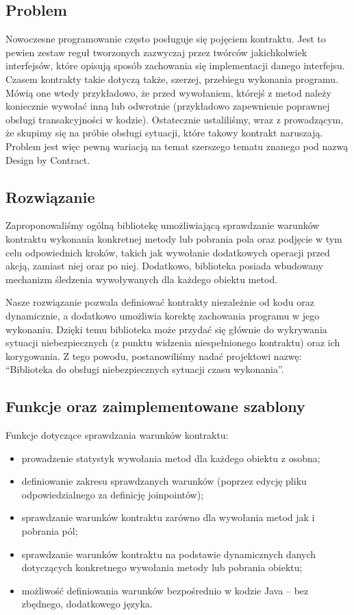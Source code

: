 \documentclass[12pt,a4paper,titlepage]{article}
\begin{document}
 \subsection{Problem}
  Nowoczesne programowanie często posługuje się pojęciem kontraktu. Jest to pewien zestaw reguł tworzonych zazwyczaj przez twórców jakichkolwiek interfejsów, które opisują sposób zachowania się implementacji danego interfejsu. Czasem kontrakty takie dotyczą także, szerzej, przebiegu wykonania programu. Mówią one wtedy przykładowo, że przed wywołaniem, którejś z metod należy koniecznie wywołać inną lub odwrotnie (przykładowo zapewnienie poprawnej obsługi transakcyjności w kodzie). Ostatecznie ustaliliśmy, wraz z prowadzącym, że skupimy się na próbie obsługi sytuacji, które takowy kontrakt naruszają. Problem jest więc pewną wariacją na temat szerszego tematu znanego pod nazwą Design by Contract.
   
 \subsection{Rozwiązanie}
  Zaproponowaliśmy ogólną bibliotekę umożliwiającą sprawdzanie warunków kontraktu wykonania konkretnej metody lub pobrania pola oraz podjęcie w tym celu odpowiednich kroków, takich jak wywołanie dodatkowych operacji przed akcją, zamiast niej oraz po niej. Dodatkowo, biblioteka posiada wbudowany mechanizm śledzenia wywoływanych dla każdego obiektu metod.
   
  Nasze rozwiązanie pozwala definiować kontrakty niezależnie od kodu oraz dynamicznie, a dodatkowo umożliwia korektę zachowania programu w jego wykonaniu. Dzięki temu biblioteka może przydać się głównie do wykrywania sytuacji niebezpiecznych (z punktu widzenia niespełnionego kontraktu) oraz ich korygowania. Z tego powodu, postanowiliśmy nadać projektowi nazwę: ``Biblioteka do obsługi niebezpiecznych sytuacji czasu wykonania''.
  
  \subsection{Funkcje oraz zaimplementowane szablony}
   Funkcje dotyczące sprawdzania warunków kontraktu:
   \begin{itemize}
    \item prowadzenie statystyk wywołania metod dla każdego obiektu z osobna;
    \item definiowanie zakresu sprawdzanych warunków (poprzez edycję pliku odpowiedzialnego za definicję joinpointów);
    \item sprawdzanie warunków kontraktu zarówno dla wywołania metod jak i pobrania pól;
    \item sprawdzanie warunków kontraktu na podstawie dynamicznych danych dotyczących konkretnego wywołania metody lub pobrania obiektu;
    \item możliwość definiowania warunków bezpośrednio w kodzie Java -- bez zbędnego, dodatkowego języka.
   \end{itemize}
   
\end{document}
